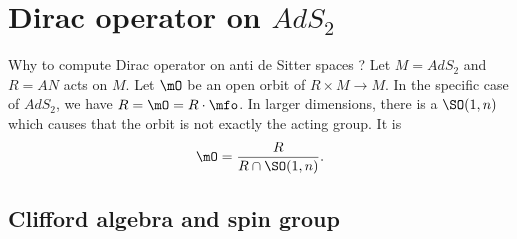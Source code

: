 
\section{Dirac operator on \texorpdfstring{$AdS_2$}{AdS2}}

Why to compute Dirac operator on anti de Sitter spaces ? Let $M=AdS_2$ and $R=AN$ acts on $M$. Let $\mO$ be an open orbit of $R\times M\to M$. In the specific case of $AdS_2$, we have $R=\mO=R\cdot\mfo$. In larger dimensions, there is a $\SO(1,n)$ which causes that the orbit is not exactly the acting group. It is
\[ 
  \mO=\frac{ R }{ R\cap \SO(1,n) }.
\]

\subsection{Clifford algebra and spin group}


